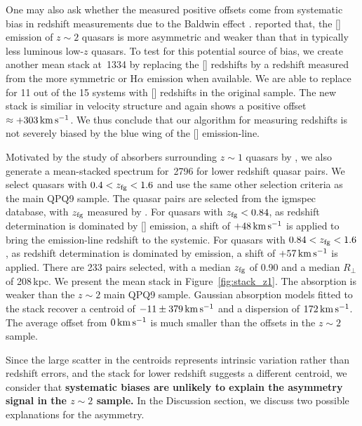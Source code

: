\documentclass[iop]{emulateapj}
\begin{document}
One may also ask whether the measured positive offsets come from systematic bias in redshift
measurements due to the Baldwin effect \citep{Baldwin77}. \cite{Shen16} reported that, the
[] emission of $z\sim2$ quasars is more asymmetric and weaker than that in typically
less luminous low-$z$ quasars. To test for this potential source of bias, we create another mean
stack at \,1334 by replacing the [] redshifts by a redshift measured from the
more symmetric  or H$\alpha$ emission when available. We are able to replace for 11 out
of the 15 systems with [] redshifts in the original sample. The new stack is similiar in
velocity structure and again shows a positive offset $\approx+303\,{\rm km\,s^{-1}}$. We thus
conclude that our algorithm for measuring redshifts is not severely biased by the blue wing of the
[] emission-line.

Motivated by the study of  absorbers surrounding $z\sim1$ quasars by \cite{Johnson+15},
we also generate a mean-stacked spectrum for \,2796 for lower redshift quasar pairs.
We select quasars with $0.4<z_{\rm fg}<1.6$ and use the same other selection criteria as the main
QPQ9 sample. The quasar pairs are selected from the igmspec database, with $z_{\rm fg}$ measured
by \cite{HewettWild10}. For quasars with $z_{\rm fg}<0.84$, as redshift determination is dominated
by [] emission, a shift of $+48\,{\rm km\,s^{-1}}$ is applied to bring the emission-line
redshift to the systemic. For quasars with $0.84<z_{\rm fg}<1.6$, as redshift determination is
dominated by  emission, a shift of $+57\,{\rm km\,s^{-1}}$ is applied. There are 233
pairs selected, with a median $z_{\rm fg}$ of 0.90 and a median $R_\perp$ of 208\,kpc. We present
the mean stack in Figure~\ref{fig:stack_z1}. The absorption is weaker than the $z\sim2$ main QPQ9
sample. Gaussian absorption models fitted to the stack recover a centroid of
$-11\pm379\,{\rm km\,s^{-1}}$ and a dispersion of $172\,{\rm km\,s^{-1}}$. The average offset
from $0\,{\rm km\,s^{-1}}$ is much smaller than the offsets in the $z\sim2$ sample.

Since the large scatter in the centroids represents intrinsic variation rather than redshift
errors, and the  stack for lower redshift suggests a different centroid, we consider
that
{\bf systematic biases are unlikely to explain the asymmetry signal in the $z\sim2$ sample.}
In the Discussion section, we discuss two possible explanations for the asymmetry.
\end{document}

